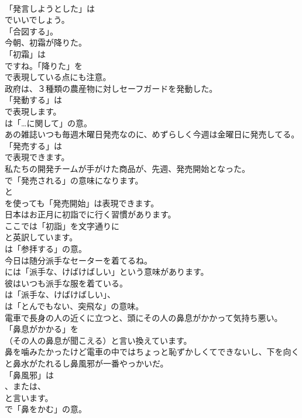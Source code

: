 \documentclass[8pt]{extreport}
\begin{document}
\begin{CJK}{UTF8}{min}
\\	「発言しようとした」は
\\	でいいでしょう。
\\	「合図する」。	
\\	今朝、初霜が降りた。 
\\	「初霜」は
\\	ですね。「降りた」を
\\	で表現している点にも注意。	
\\	政府は、３種類の農産物に対しセーフガードを発動した。 
\\	「発動する」は 
\\	で表現します。
\\	は「…に関して」の意。	
\\	あの雑誌いつも毎週木曜日発売なのに、めずらしく今週は金曜日に発売してる。 
\\	「発売する」は 
\\	で表現できます。	
\\	私たちの開発チームが手がけた商品が、先週、発売開始となった。 
\\	で「発売される」の意味になります。
\\	と 
\\	を使っても「発売開始」は表現できます。	
\\	日本はお正月に初詣でに行く習慣があります。 
\\	ここでは「初詣」を文字通りに
\\	と英訳しています。
\\	は「参拝する」の意。	
\\	今日は随分派手なセーターを着てるね。 
\\	には「派手な、けばけばしい」という意味があります。	
\\	彼はいつも派手な服を着ている。 
\\	は「派手な、けばけばしい」、
\\	は「とんでもない、突飛な」の意味。	
\\	電車で長身の人の近くに立つと、頭にその人の鼻息がかかって気持ち悪い。 
\\	「鼻息がかかる」を
\\	（その人の鼻息が聞こえる）と言い換えています。	
\\	鼻を噛みたかったけど電車の中ではちょっと恥ずかしくてできないし、下を向くと鼻水がたれるし鼻風邪が一番やっかいだ。 
\\	「鼻風邪」は
\\	、または、
\\	と言います。
\\	で「鼻をかむ」の意。	

\end{CJK}
\end{document}
